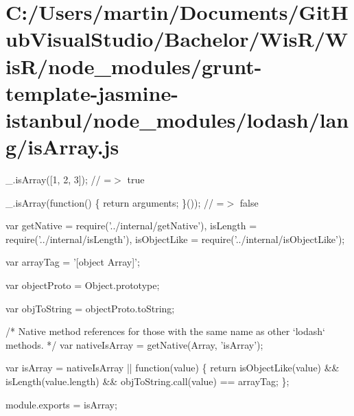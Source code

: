 \hypertarget{_c_1_2_users_2martin_2_documents_2_git_hub_visual_studio_2_bachelor_2_wis_r_2_wis_r_2node_moduleb29754afc9a8fc336fe9ca722d60090f}{}\section{C\+:/\+Users/martin/\+Documents/\+Git\+Hub\+Visual\+Studio/\+Bachelor/\+Wis\+R/\+Wis\+R/node\+\_\+modules/grunt-\/template-\/jasmine-\/istanbul/node\+\_\+modules/lodash/lang/is\+Array.\+js}
\+\_\+.\+is\+Array(\mbox{[}1, 2, 3\mbox{]}); // =$>$ true

\+\_\+.\+is\+Array(function() \{ return arguments; \}()); // =$>$ false


\begin{DoxyCodeInclude}
var getNative = require(\textcolor{stringliteral}{'../internal/getNative'}),
    isLength = require(\textcolor{stringliteral}{'../internal/isLength'}),
    isObjectLike = require(\textcolor{stringliteral}{'../internal/isObjectLike'});

var arrayTag = \textcolor{stringliteral}{'[object Array]'};

var objectProto = Object.prototype;

var objToString = objectProto.toString;

\textcolor{comment}{/* Native method references for those with the same name as other `lodash` methods. */}
var nativeIsArray = getNative(Array, \textcolor{stringliteral}{'isArray'});

var isArray = nativeIsArray || \textcolor{keyword}{function}(value) \{
  \textcolor{keywordflow}{return} isObjectLike(value) && isLength(value.length) && objToString.call(value) == arrayTag;
\};

module.exports = isArray;
\end{DoxyCodeInclude}
 